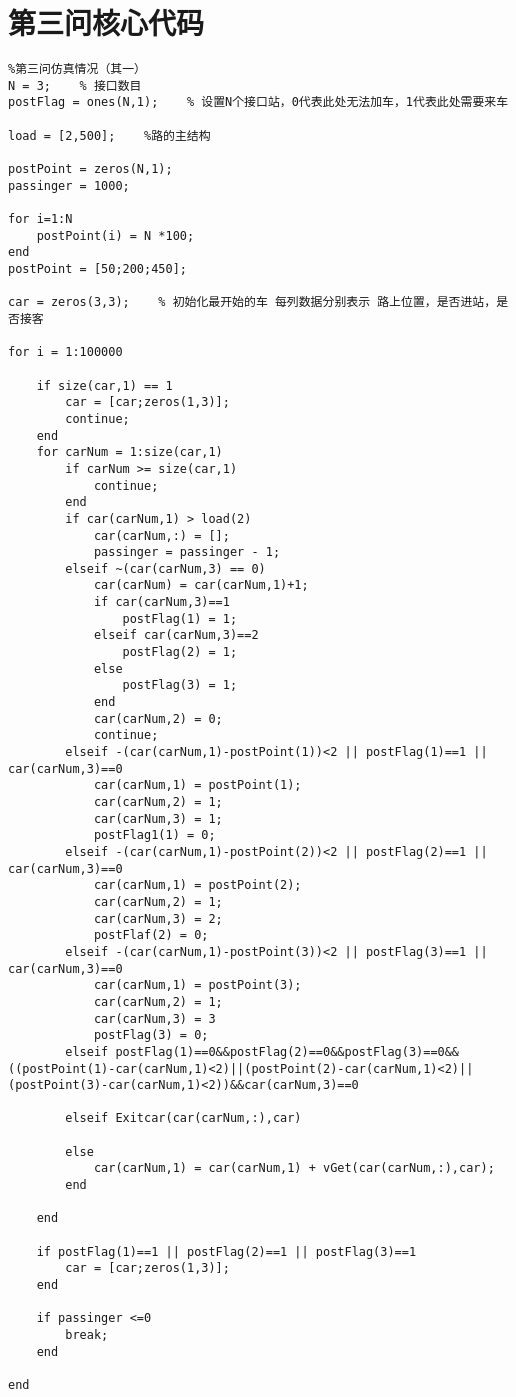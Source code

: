 \documentclass[withoutpreface,bwprint]{cumcmthesis} %
\begin{document}
\section{第三问核心代码}
\begin{lstlisting}
%第三问仿真情况（其一）
N = 3;    % 接口数目
postFlag = ones(N,1);    % 设置N个接口站，0代表此处无法加车，1代表此处需要来车

load = [2,500];    %路的主结构

postPoint = zeros(N,1);
passinger = 1000;

for i=1:N
    postPoint(i) = N *100;
end
postPoint = [50;200;450];

car = zeros(3,3);    % 初始化最开始的车 每列数据分别表示 路上位置，是否进站，是否接客

for i = 1:100000
    
    if size(car,1) == 1
        car = [car;zeros(1,3)];
        continue;
    end
    for carNum = 1:size(car,1)
        if carNum >= size(car,1)
            continue;
        end
        if car(carNum,1) > load(2)
            car(carNum,:) = [];
            passinger = passinger - 1;
        elseif ~(car(carNum,3) == 0)
            car(carNum) = car(carNum,1)+1;
            if car(carNum,3)==1
                postFlag(1) = 1;
            elseif car(carNum,3)==2
                postFlag(2) = 1;
            else
                postFlag(3) = 1;
            end
            car(carNum,2) = 0;
            continue;
        elseif -(car(carNum,1)-postPoint(1))<2 || postFlag(1)==1 || car(carNum,3)==0
            car(carNum,1) = postPoint(1);
            car(carNum,2) = 1;
            car(carNum,3) = 1;
            postFlag1(1) = 0;
        elseif -(car(carNum,1)-postPoint(2))<2 || postFlag(2)==1 || car(carNum,3)==0
            car(carNum,1) = postPoint(2);
            car(carNum,2) = 1;
            car(carNum,3) = 2;
            postFlaf(2) = 0;
        elseif -(car(carNum,1)-postPoint(3))<2 || postFlag(3)==1 || car(carNum,3)==0
            car(carNum,1) = postPoint(3);
            car(carNum,2) = 1;
            car(carNum,3) = 3
            postFlag(3) = 0;
        elseif postFlag(1)==0&&postFlag(2)==0&&postFlag(3)==0&&((postPoint(1)-car(carNum,1)<2)||(postPoint(2)-car(carNum,1)<2)||(postPoint(3)-car(carNum,1)<2))&&car(carNum,3)==0
            
        elseif Exitcar(car(carNum,:),car)
            
        else
            car(carNum,1) = car(carNum,1) + vGet(car(carNum,:),car);
        end
        
    end
    
    if postFlag(1)==1 || postFlag(2)==1 || postFlag(3)==1
        car = [car;zeros(1,3)];
    end
    
    if passinger <=0
        break;
    end
    
end

\end{lstlisting}
\end{document}
